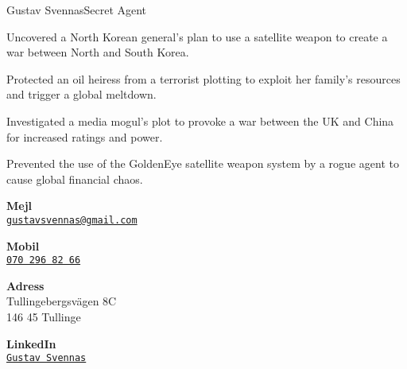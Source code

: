 \documentclass{article}
\begin{document}
\begin{cv}[avatar]{Gustav Svennas}{Secret Agent}

\begin{cvevent}[2002]
    Uncovered a North Korean general's plan to use a satellite weapon to create a war between North and South Korea.
\end{cvevent}

\cvseparator[2]
\begin{cvevent}[1999]
    Protected an oil heiress from a terrorist plotting to exploit her family's resources and trigger a global meltdown.
\end{cvevent}

\cvseparator[2]
\begin{cvevent}[1997]
    Investigated a media mogul's plot to provoke a war between the UK and China for increased ratings and power.
\end{cvevent}

\cvseparator[2]
\begin{cvevent}[1995]
    Prevented the use of the GoldenEye satellite weapon system by a rogue agent to cause global financial chaos.
\end{cvevent}


\cvsidebar %



\begin{cvitem}[Envelope][4]
    \textbf{Mejl}\\
    \href{mailto:gustavsvennas@gmail.com}{\texttt{gustavsvennas@gmail.com}}
\end{cvitem}

\cvseparator[3]
\begin{cvitem}[Phone][4]
    \textbf{Mobil}\\
    \href{tel:+46702968266}{\texttt{070 296 82 66}}
\end{cvitem}

\cvseparator[3]
\begin{cvitem}[Home][4]
    \textbf{Adress}\\
    Tullingebergsvägen 8C\\ 146 45 Tullinge
\end{cvitem}

\cvseparator[3]
\begin{cvitem}[Globe][4]
    \textbf{LinkedIn}\\
    \href{https://www.linkedin.com/in/gustav-svennas-18b575159}{\texttt{Gustav Svennas}}
\end{cvitem}



\end{cv}
\end{document}
